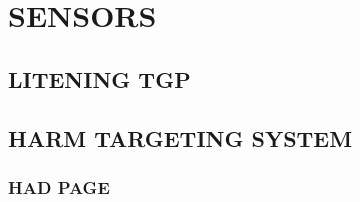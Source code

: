 \chapter{SENSORS}
\minitoc
\cleardoublepage

\section{LITENING TGP}

\clearpage 

\section{HARM TARGETING SYSTEM}
\subsection{HAD PAGE}
